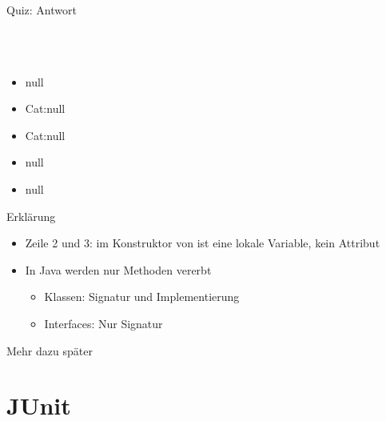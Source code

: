 \documentclass[usepdftitle=false,hyperref={pdfpagelabels=false}]{beamer}
\begin{document}
\begin{frame}{Quiz: Antwort}
    \begin{minipage}[b]{0.45\linewidth}
        \inputminted[linenos=false, numbersep=5pt, tabsize=4, fontsize=\tiny, label=Animal.java, frame=lines]{java}{Animal.java}
        \inputminted[linenos=false, numbersep=5pt, tabsize=4, fontsize=\tiny, label=Jungle.java, frame=lines]{java}{Jungle.java}
    \end{minipage}
    \hspace{0.5cm}
    \begin{minipage}[b]{0.45\linewidth}
        \inputminted[linenos=false, numbersep=5pt, tabsize=4, fontsize=\tiny, label=Tiger.java, frame=lines]{java}{Tiger.java}
        \inputminted[linenos=false, numbersep=5pt, tabsize=4, fontsize=\tiny, label=Cat.java, frame=lines]{java}{Cat.java}
        \begin{itemize}
            \item null
            \item Cat:null
            \item Cat:null
            \item null
            \item null
        \end{itemize}
    \end{minipage}
\end{frame}

\begin{frame}{Erklärung}
    \begin{itemize}
        \item Zeile 2 und 3:  im Konstruktor von  ist eine 
              lokale Variable, kein Attribut
        \item In Java werden nur Methoden vererbt
            \begin{itemize}
                \item Klassen: Signatur und Implementierung
                \item Interfaces: Nur Signatur
            \end{itemize}
    \end{itemize}

    Mehr dazu später
\end{frame}

\section{JUnit}
\end{document}
